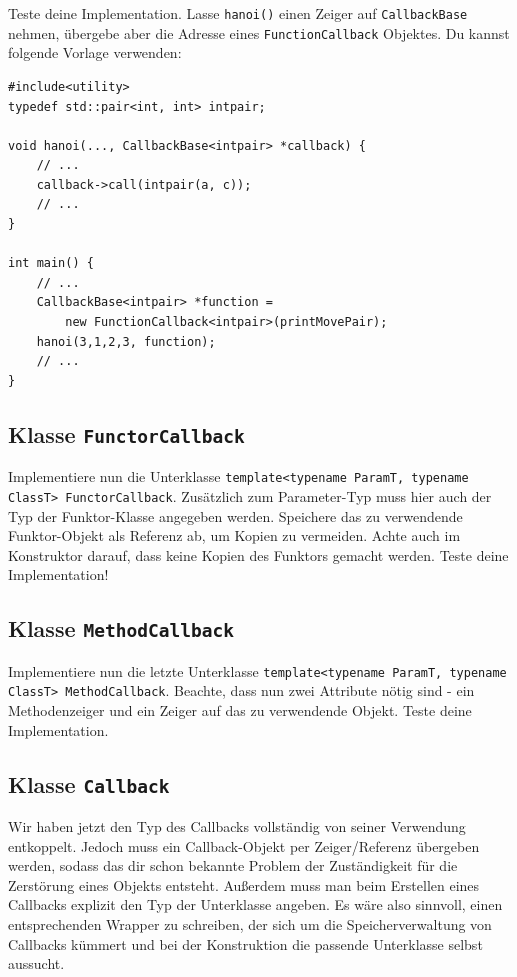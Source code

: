 Teste deine Implementation.
Lasse \lstinline{hanoi()} einen Zeiger auf \lstinline{CallbackBase} nehmen, übergebe aber die Adresse eines \lstinline{FunctionCallback} Objektes.
Du kannst folgende Vorlage verwenden:
\begin{lstlisting}
#include<utility>
typedef std::pair<int, int> intpair;

void hanoi(..., CallbackBase<intpair> *callback) {
	// ...
	callback->call(intpair(a, c));
	// ...
}

int main() {
	// ...
	CallbackBase<intpair> *function =
	    new FunctionCallback<intpair>(printMovePair);
	hanoi(3,1,2,3, function);
	// ...
}
\end{lstlisting}


\subsection{Klasse \lstinline{FunctorCallback}}
Implementiere nun die Unterklasse \lstinline{template<typename ParamT, typename ClassT> FunctorCallback}.
Zusätzlich zum Parameter-Typ muss hier auch der Typ der Funktor-Klasse angegeben werden.
Speichere das zu verwendende Funktor-Objekt als Referenz ab, um Kopien zu vermeiden.
Achte auch im Konstruktor darauf, dass keine Kopien des Funktors gemacht werden.
Teste deine Implementation!



\subsection{Klasse \lstinline{MethodCallback}}
Implementiere nun die letzte Unterklasse \lstinline{template<typename ParamT, typename ClassT> MethodCallback}.
Beachte, dass nun zwei Attribute nötig sind - ein Methodenzeiger und ein Zeiger auf das zu verwendende Objekt.
Teste deine Implementation.


\subsection{Klasse \lstinline{Callback}}
Wir haben jetzt den Typ des Callbacks vollständig von seiner Verwendung entkoppelt.
Jedoch muss ein Callback-Objekt per Zeiger/Referenz übergeben werden, sodass das dir schon bekannte Problem der Zuständigkeit für die Zerstörung eines Objekts entsteht.
Außerdem muss man beim Erstellen eines Callbacks explizit den Typ der Unterklasse angeben.
Es wäre also sinnvoll, einen entsprechenden Wrapper zu schreiben, der sich um die Speicherverwaltung von Callbacks kümmert und bei der Konstruktion die passende Unterklasse selbst aussucht.

